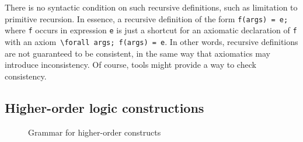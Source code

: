 %  

There is no syntactic condition on such recursive
definitions, such as limitation to primitive recursion. In essence, a
recursive definition of the form \lstinline+f(args) = e;+ where
\lstinline+f+ occurs in expression \lstinline+e+ is just a shortcut
for an axiomatic declaration of \lstinline+f+ with an 
axiom~\lstinline+\forall args; f(args) = e+.  In other words, recursive
definitions are not guaranteed to be consistent, in the same way that
axiomatics may introduce inconsistency. Of course, tools might provide
a way to check consistency.

\subsection{Higher-order logic constructions}
\label{sec:higherorder}

\experimental

\begin{figure}[t]
  \begin{cadre}
      
    \end{cadre}
  \caption{Grammar for higher-order constructs}
\label{fig:gram:higherorder}
\end{figure}

